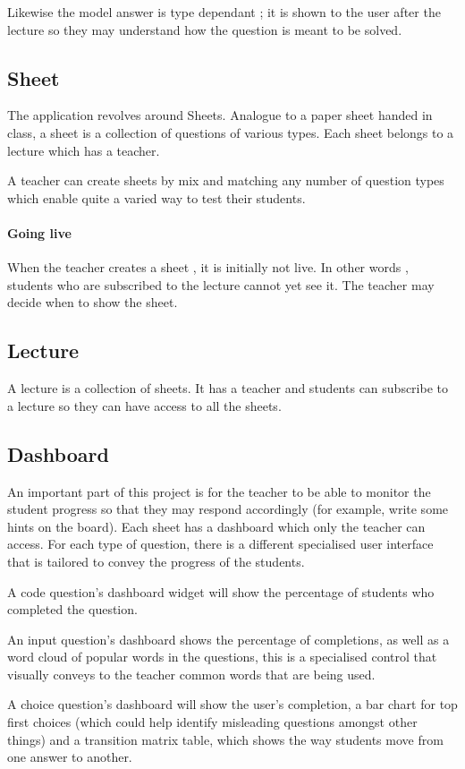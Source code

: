 Likewise the model answer is type dependant ; it is shown to the user after the lecture so they may understand how the question is meant to be solved.


\subsection{Sheet}
The application revolves around Sheets. Analogue to a paper sheet handed in class, a sheet is a collection of questions of various types. Each sheet belongs to a lecture which has a teacher.


A teacher can create sheets by mix and matching any number of question types which enable quite a varied way to test their students.

\paragraph{Going live} When the teacher creates a sheet , it is initially not live. In other words , students who are subscribed to the lecture cannot yet see it. The teacher may decide when to show the sheet.

\subsection{Lecture}
A lecture is a collection of sheets. It has a teacher and students can subscribe to a lecture so they can have access to all the sheets.

\subsection{Dashboard}
An important part of this project is for the teacher to be able to monitor the student progress so that they may respond accordingly (for example, write some hints on the board). Each sheet has a dashboard which only the teacher can access.
For each type of question, there is a different specialised user interface that is tailored to convey the progress of the students.

A code question's dashboard widget will show the percentage of students who completed the question. 

An input question’s dashboard shows the percentage of completions, as well as a word cloud of popular words in the questions, this is a specialised control that visually conveys to the teacher common words that are being used.

A choice question’s dashboard will show the user’s completion, a bar chart for top first choices (which could help identify misleading questions amongst other things) and a transition matrix table, which shows the way students move from one answer to another.

